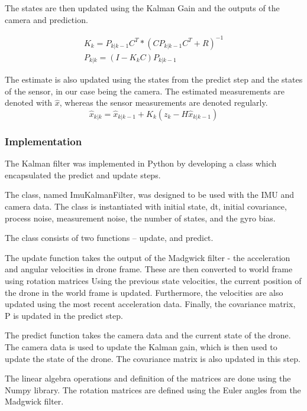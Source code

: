 \documentclass[bare_jrnl_transmag]{subfiles}
\begin{document}
The states are then updated using the Kalman Gain and the outputs of the camera and prediction.

\begin{eqnarray*}
    K_k = P_{k|k-1} C^T * (C P_{k|k-1} C^T + R)^{-1} \\[1em]
    P_{k|k} = (I - K_k C) P_{k|k-1}
\end{eqnarray*}

The estimate is also updated using the states from the predict step and the states of the sensor, in our case being the camera. 
The estimated measurements are denoted with $\hat{x}$, whereas the sensor measurements are denoted regularly. 
\begin{equation*}
    \hat{x}_{k|k} = \hat{x}_{k|k-1} + K_k (z_k - H \hat{x}_{k|k-1})
\end{equation*}

\subsubsection{Implementation}

The Kalman filter was implemented in Python by developing a class which encapsulated the predict and update steps. 

The class, named ImuKalmanFilter, was designed to be used with the IMU and camera data. The class is instantiated with initial state, dt, initial covariance, process noise, measurement noise, the number of states, and the gyro bias. 

The class consists of two functions -- update, and predict. 

The update function takes the output of the Madgwick filter - the acceleration and angular velocities in drone frame. These are then converted to world frame using rotation matrices Using the previous state velocities, the current position of the drone in the world frame is updated. Furthermore, the velocities are also updated using the most recent acceleration data. Finally, the covariance matrix, P is updated in the predict step.

The predict function takes the camera data and the current state of the drone. The camera data is used to update the Kalman gain, which is then used to update the state of the drone. The covariance matrix is also updated in this step.

The linear algebra operations and definition of the matrices are done using the Numpy library. The rotation matrices are defined using the Euler angles from the Madgwick filter. 
\end{document}
